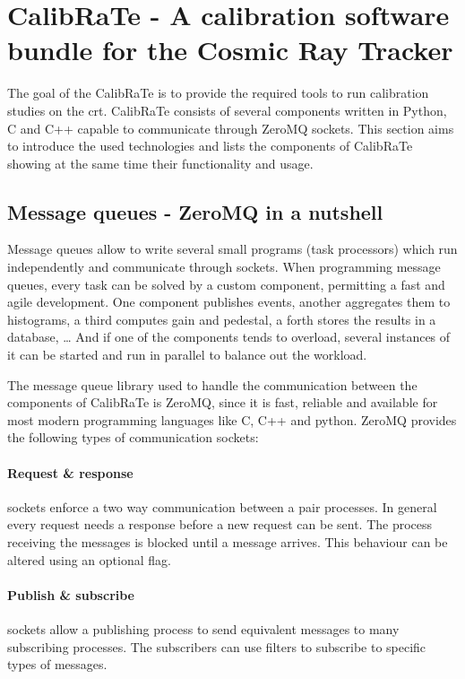 \section{CalibRaTe - A calibration software bundle for the Cosmic Ray Tracker}
The goal of the CalibRaTe is to provide the required tools to run calibration studies on the \gls{crt}.
CalibRaTe consists of several components written in Python, C and C++ capable to communicate through ZeroMQ sockets.
This section aims to introduce the used technologies and lists the components of CalibRaTe showing at the same time their functionality and usage.

\subsection{Message queues - ZeroMQ in a nutshell}

Message queues allow to write several small programs (task processors) which run independently and communicate through sockets.
When programming message queues, every task can be solved by a custom component, permitting a fast and agile development.
One component publishes events, another aggregates them to histograms, a third computes gain and pedestal, a forth stores the results in a database, \ldots
And if one of the components tends to overload, several instances of it can be started and run in parallel to balance out the workload.

The message queue library used to handle the communication between the components of CalibRaTe is ZeroMQ, since it is fast, reliable and available for most modern programming languages like C, C++ and python.
ZeroMQ provides the following types of communication sockets:

\paragraph{Request \& response} sockets enforce a two way communication between a pair processes.
In general every request needs a response before a new request can be sent.
The process receiving the messages is blocked until a message arrives.
This behaviour can be altered using an optional flag.

\paragraph{Publish \& subscribe} sockets allow a publishing process to send equivalent messages to many subscribing processes.
The subscribers can use filters to subscribe to specific types of messages.

